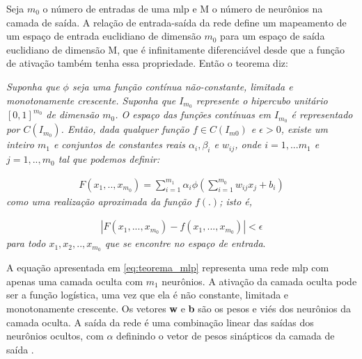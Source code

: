 Seja $m_{0}$ o número de entradas de uma \acrshort{mlp} e M o número de neurônios na camada de saída. A relação de entrada-saída da rede define um mapeamento de um espaço de entrada euclidiano de dimensão $m_{0}$ para um espaço de saída euclidiano de dimensão M, que é infinitamente diferenciável desde que a função de ativação também tenha essa propriedade. Então o teorema diz:

\textit{Suponha que $\phi$ seja uma função contínua não-constante, limitada e monotonamente crescente. Suponha que $I_{m_{0}}$ represente o hipercubo unitário $[0,1]^{m_{0}}$ de dimensão $m_{0}$. O espaço das funções contínuas em $I_{m_{0}}$ é representado por $C(I_{m_{0}})$. Então, dada qualquer função $f \in C(I_{m{0}})$ e $\epsilon>0$, existe um inteiro $m_{1}$ e conjuntos de constantes reais $\alpha_{i},\beta_{i}$ e $w_{ij}$, onde  $i = 1,...m_{1}$ e $j = 1, .., m_{0}$ tal que podemos definir:}

\begin{equation}
\label{eq:teorema_mlp}
\begin{aligned}
F(x_{1},..,x_{m_{0}}) = \sum_{i=1}^{m_{1}}\alpha_{i}\phi(\sum_{i=1}^{m_{0}}w_{ij}x_{j}+b_{i})
\end{aligned}
\end{equation}
\textit{como uma realização aproximada da função $f(.)$; isto é,}

\begin{equation}
\begin{aligned}
|F(x_{1},...,x_{m_{0}}) -f(x_{1},...,x_{m_{0}}) | < \epsilon
\end{aligned}
\end{equation}
\textit{para todo $x_{1},x_{2},..,x_{m_{0}}$ que se encontre no espaço de entrada}.

A equação apresentada em \ref{eq:teorema_mlp} representa uma rede \acrshort{mlp} com apenas uma camada oculta com $m_{1}$ neurônios. A ativação da camada oculta pode ser a função logística, uma vez que ela é não constante, limitada e monotonamente crescente. Os vetores \textbf{w} e \textbf{b} são os pesos e viés dos neurônios da camada oculta. A saída da rede é uma combinação linear das saídas dos neurônios ocultos, com \textbf{$\alpha$} definindo o vetor de pesos sinápticos da camada de saída \cite{Haykin}.  

